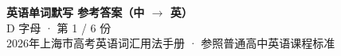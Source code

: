 \documentclass[10pt,a4paper]{article}
\begin{document}
\pagestyle{plain}

\begin{center}
{\LARGE\bfseries 英语单词默写 \quad 参考答案（中 $\to$ 英）}\\[0.22em]
{\large D 字母 · 第 1 / 6 份}\\[0.18em]
{\small 2026年上海市高考英语词汇用法手册 · 参照普通高中英语课程标准}
\end{center}

\vspace{0.2em}
\noindent{\color{rulegray}\rule{\textwidth}{0.8pt}}

\vspace{0.35em}

\vspace{0.25em}
\renewcommand{\arraystretch}{1.32}
\end{document}
